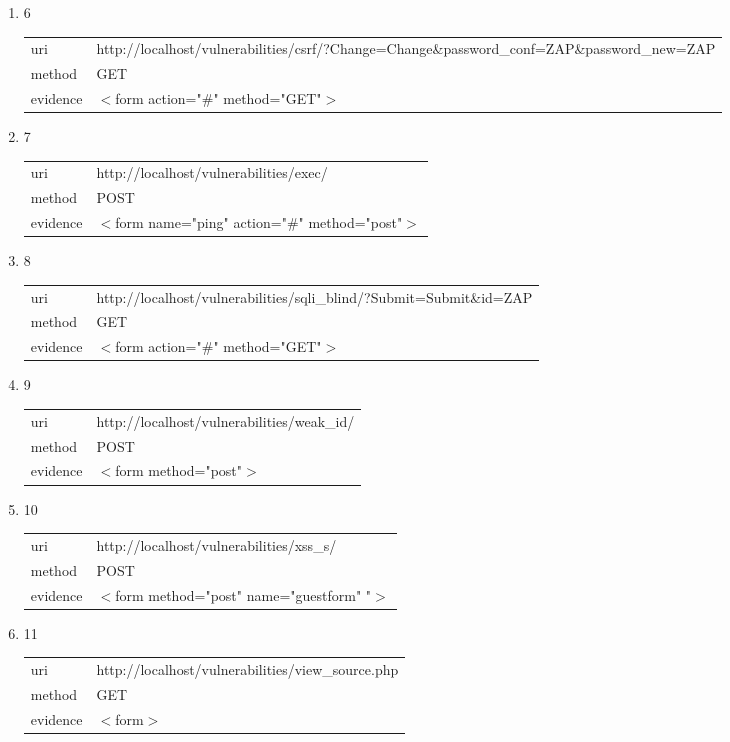 \documentclass[10pt]{article}
\begin{document}
\begin{itemize}
\begin{enumerate}
\begin{tabular}{| l | p{14cm}}
\end{tabular}
\item[] 6
\begin{tabular}{| l | p{14cm}}
uri & http://localhost/vulnerabilities/csrf/?Change=Change\&password{\_}conf=ZAP\&password{\_}new=ZAP \\
method & GET \\
evidence & $<$form action="\#" method="GET"$>$ \\
\end{tabular}
\item[] 7
\begin{tabular}{| l | p{14cm}}
uri & http://localhost/vulnerabilities/exec/ \\
method & POST \\
evidence & $<$form name="ping" action="\#" method="post"$>$ \\
\end{tabular}
\item[] 8
\begin{tabular}{| l | p{14cm}}
uri & http://localhost/vulnerabilities/sqli{\_}blind/?Submit=Submit\&id=ZAP \\
method & GET \\
evidence & $<$form action="\#" method="GET"$>$ \\
\end{tabular}
\item[] 9
\begin{tabular}{| l | p{14cm}}
uri & http://localhost/vulnerabilities/weak{\_}id/ \\
method & POST \\
evidence & $<$form method="post"$>$ \\
\end{tabular}
\item[] 10
\begin{tabular}{| l | p{14cm}}
uri & http://localhost/vulnerabilities/xss{\_}s/ \\
method & POST \\
evidence & $<$form method="post" name="guestform" "$>$ \\
\end{tabular}
\item[] 11
\begin{tabular}{| l | p{14cm}}
uri & http://localhost/vulnerabilities/view{\_}source.php \\
method & GET \\
evidence & $<$form$>$ \\
\end{tabular}

\end{enumerate}
\end{itemize}
\end{document}

